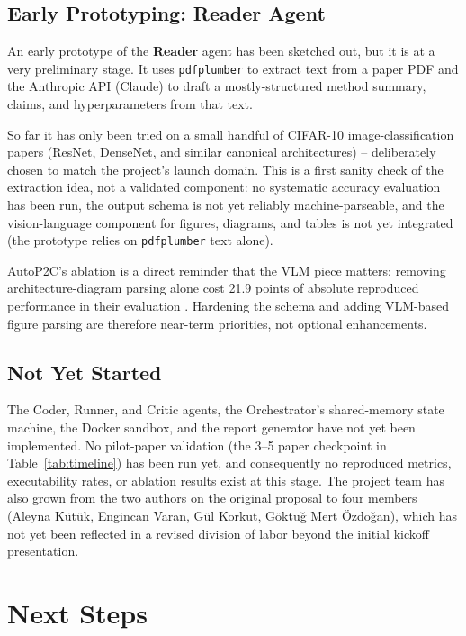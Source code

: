 \documentclass[11pt]{article}
\begin{document}
\subsection{Early Prototyping: Reader Agent}

An early prototype of the \textbf{Reader} agent has been sketched out, but it is at a
very preliminary stage. It uses \texttt{pdfplumber} to extract text from a paper PDF and
the Anthropic API (Claude) to draft a mostly-structured method summary, claims, and
hyperparameters from that text.

So far it has only been tried on a small handful of CIFAR-10 image-classification papers
(ResNet, DenseNet, and similar canonical architectures) -- deliberately chosen to match
the project's launch domain. This is a first sanity check of the extraction idea, not a
validated component: no systematic accuracy evaluation has been run, the output schema is
not yet reliably machine-parseable, and the vision-language component for figures,
diagrams, and tables is not yet integrated (the prototype relies on \texttt{pdfplumber}
text alone).

AutoP2C's ablation is a direct reminder that the VLM piece matters: removing
architecture-diagram parsing alone cost 21.9 points of absolute reproduced performance in
their evaluation \cite{lin2025autop2c}. Hardening the schema and adding VLM-based figure
parsing are therefore near-term priorities, not optional enhancements.

\subsection{Not Yet Started}

The Coder, Runner, and Critic agents, the Orchestrator's shared-memory state machine, the
Docker sandbox, and the report generator have not yet been implemented. No pilot-paper
validation (the 3--5 paper checkpoint in Table~\ref{tab:timeline}) has been run yet, and
consequently no reproduced metrics, executability rates, or ablation results exist at
this stage. The project team has also grown from the two authors on the original
proposal to four members (Aleyna Kütük, Engincan Varan, Gül Korkut, Göktuğ Mert
Özdoğan), which has not yet been reflected in a revised division of labor beyond the
initial kickoff presentation.

\section{Next Steps}
\label{sec:next}
\end{document}
